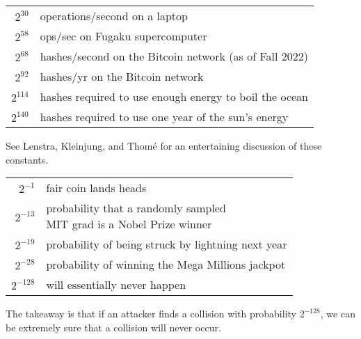 \begin{table}[htpb]
	\centering

	\begin{tabular}{rl}
		$2^{30}$ & operations/second on a laptop \\
		$2^{58}$ & ops/sec on Fugaku supercomputer \\
		$2^{68}$ & hashes/second on the Bitcoin network (as of Fall 2022) \\
    $2^{92}$ & hashes/yr on the Bitcoin network\\
		$2^{114}$ & hashes required to use enough energy to boil the ocean \\
		$2^{140}$ & hashes required to use one year of the sun's energy \\
	\end{tabular}
\end{table}

See Lenstra, Kleinjung, and Thom{\'e} for an entertaining
discussion of these constants.\cite{lenstra:universal}

\begin{table}[htpb]
	\centering

	\begin{tabular}{rl}
		$2^{-1}$ & fair coin lands heads \\
    $2^{-13}$ & \parbox{3.5in}{probability that a randomly sampled\\[-3pt] MIT grad is a Nobel Prize winner}\\
    $2^{-19}$ & probability of being struck by lightning next year\\
		$2^{-28}$ & probability of winning the Mega Millions jackpot\\
		$2^{-128}$ & will essentially never happen \\
	\end{tabular}
\end{table}



The takeaway is that if an attacker finds a collision with probability
$2^{-128}$, we can be extremely sure that a collision will never occur.

